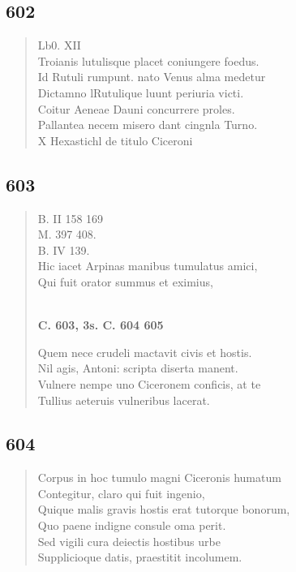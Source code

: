 \documentclass[11pt, a4paper]{report}
\begin{document}
            \subsection*{602}
      \begin{verse}
      Lb0. XII \\ Troianis lutulisque placet coniungere foedus. \\ Id Rutuli rumpunt. nato Venus alma medetur \\ Dictamno lRutulique luunt periuria victi. \\ Coitur Aeneae Dauni concurrere proles. \\ Pallantea necem misero dant cingnla Turno. \\ X  \lbrack Hexastichl de titulo Ciceroni \\ 
      \end{verse}
  
            \subsection*{603}
      \begin{verse}
      B. II 158 169 \\ M. 397 408. \\ B. IV 139. \\ Hic iacet Arpinas manibus tumulatus amici, \\ Qui fuit orator summus et eximius, \\ 
        ﻿\pagebreak 
    \begin{center} \textbf{C. 603, 3s. C. 604 605} \end{center} \marginpar{[87]} Quem nece crudeli mactavit civis et hostis. \\ Nil agis, Antoni: scripta diserta manent. \\ Vulnere nempe uno Ciceronem conficis, at te \\ Tullius aeteruis vulneribus lacerat. \\ 
      \end{verse}
  
            \subsection*{604}
      \begin{verse}
      Corpus in hoc tumulo magni Ciceronis humatum \\ Contegitur, claro qui fuit ingenio, \\ Quique malis gravis hostis erat tutorque bonorum, \\ Quo paene indigne consule oma perit. \\ Sed vigili cura deiectis hostibus urbe \\ Supplicioque datis, praestitit incolumem. \\ 
      \end{verse}
  
\end{document}
